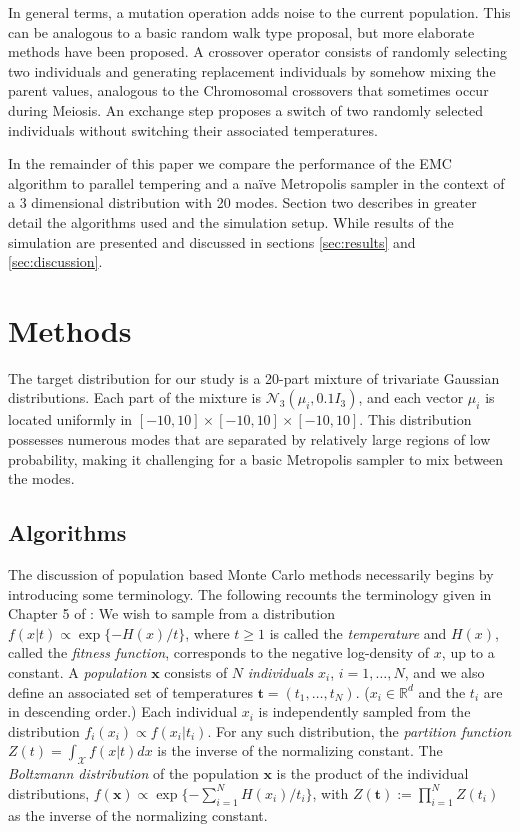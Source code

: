 \documentclass[12pt]{article}\usepackage[]{graphicx}\usepackage[]{color}
\newcommand{\bx}{\mathbf x}
\newcommand{\bt}{\mathbf t}
\newcommand{\X}{\mathcal X}
\begin{document}
In general terms, a mutation operation adds noise to the current
population. This can be analogous to a basic random walk type
proposal, but more elaborate methods have been proposed. A crossover
operator consists of randomly selecting two individuals and generating
replacement individuals by somehow mixing the parent values, analogous
to the Chromosomal crossovers that sometimes occur during Meiosis.  An
exchange step proposes a switch of two randomly selected individuals
without switching their associated temperatures.


In the remainder of this paper we compare the performance of the EMC
algorithm to parallel tempering and a na\"ive Metropolis sampler in
the context of a 3 dimensional distribution with 20 modes.  Section
two describes in greater detail the algorithms used and the simulation
setup.  While results of the simulation are presented and discussed in
sections \ref{sec:results} and \ref{sec:discussion}.

\setcounter{section}{1}
\section{Methods}
\label{sec:methods}
The target distribution for our study is a 20-part mixture of
trivariate Gaussian distributions. Each part of the mixture is
$\mathcal{N}_3(\mu_i, 0.1I_3)$, and each vector $\mu_i$ is located
uniformly in $[-10,10]\times[-10,10]\times[-10,10].$ This distribution
possesses numerous modes that are separated by relatively large
regions of low probability, making it challenging for a basic
Metropolis sampler to mix between the modes.

\subsection{Algorithms}
\label{sec:algorithms}
The discussion of population based Monte Carlo methods necessarily
begins by introducing some terminology. The following recounts the
terminology given in Chapter 5 of \cite{Liang:2011}: We wish to sample
from a distribution $f(x|t) \propto \exp\{ -H(x)/t \}$, where $t\ge 1$
is called the \emph{temperature} and $H(x)$, called the \emph{fitness
  function}, corresponds to the negative log-density of $x$, up to a
constant. A \emph{population} $\mathbf{x}$ consists of $N$
\emph{individuals} $x_i$, $i = 1, \ldots, N$, and we also define an
associated set of temperatures $\bt = (t_1,\ldots,t_N)$. ($x_i \in
\mathbb{R}^d$ and the $t_i$ are in descending order.) Each individual
$x_i$ is independently sampled from the distribution $f_i(x_i) \propto
f(x_i|t_i)$.  For any such distribution, the \emph{partition function}
$Z(t)= \int_\X f(x|t) dx$ is the inverse of the normalizing
constant. The \emph{Boltzmann distribution} of the population $\bx$ is
the product of the individual distributions, $f(\bx) \propto \exp \{
-\sum_{i=1}^N H(x_i)/ t_i \}$, with $Z(\bt) := \prod_{i=1}^N Z(t_i)$
as the inverse of the normalizing constant.
\end{document}
